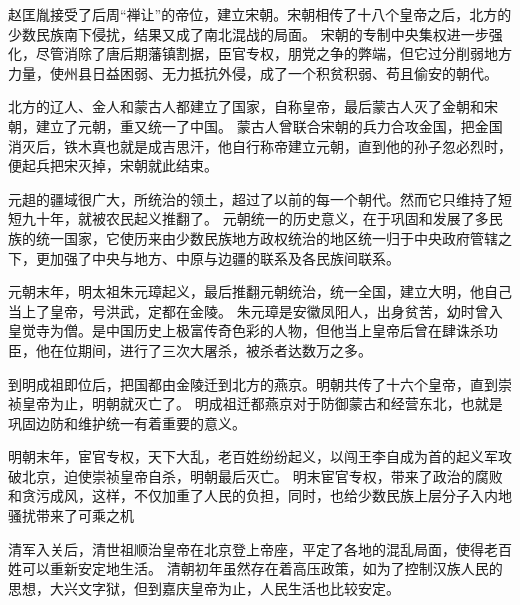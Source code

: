 \documentclass[avery5371,grid]{flashcards}
\begin{document}
{赵匡胤接受了后周“禅让”的帝位，建立宋朝。宋朝相传了十八个皇帝之后，北方的少数民族南下侵扰，结果又成了南北混战的局面。} %
{宋朝的专制中央集权进一步强化，尽管消除了唐后期藩镇割据，臣官专权，朋党之争的弊端，但它过分削弱地方力量，使州县日益困弱、无力抵抗外侵，成了一个积贫积弱、苟且偷安的朝代。} %



{北方的辽人、金人和蒙古人都建立了国家，自称皇帝，最后蒙古人灭了金朝和宋朝，建立了元朝，重又统一了中国。} %
{蒙古人曾联合宋朝的兵力合攻金国，把金国消灭后，铁木真也就是成吉思汗，他自行称帝建立元朝，直到他的孙子忽必烈时，便起兵把宋灭掉，宋朝就此结束。} %

{元趄的疆域很广大，所统治的领土，超过了以前的每一个朝代。然而它只维持了短短九十年，就被农民起义推翻了。} %
{元朝统一的历史意义，在于巩固和发展了多民族的统一国家，它使历来由少数民族地方政权统治的地区统一归于中央政府管辖之下，更加强了中央与地方、中原与边疆的联系及各民族间联系。} %

{元朝末年，明太祖朱元璋起义，最后推翻元朝统治，统一全国，建立大明，他自己当上了皇帝，号洪武，定都在金陵。} %
{朱元璋是安徽凤阳人，出身贫苦，幼时曾入皇觉寺为僧。是中国历史上极富传奇色彩的人物，但他当上皇帝后曾在肆诛杀功臣，他在位期间，进行了三次大屠杀，被杀者达数万之多。} %

{到明成祖即位后，把国都由金陵迁到北方的燕京。明朝共传了十六个皇帝，直到崇祯皇帝为止，明朝就灭亡了。} %
{明成祖迁都燕京对于防御蒙古和经营东北，也就是巩固边防和维护统一有着重要的意义。} %

{明朝末年，宦官专权，天下大乱，老百姓纷纷起义，以闯王李自成为首的起义军攻破北京，迫使崇祯皇帝自杀，明朝最后灭亡。} %
{明末宦官专权，带来了政治的腐败和贪污成风，这样，不仅加重了人民的负担，同时，也给少数民族上层分子入内地骚扰带来了可乘之机} %

{清军入关后，清世祖顺治皇帝在北京登上帝座，平定了各地的混乱局面，使得老百姓可以重新安定地生活。} %
{清朝初年虽然存在着高压政策，如为了控制汉族人民的思想，大兴文字狱，但到嘉庆皇帝为止，人民生活也比较安定。} %
\end{document}
